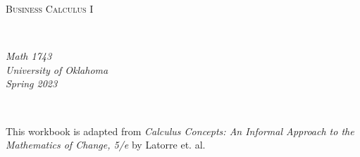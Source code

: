 \documentclass[notes]{subfiles}
\begin{document}
\rhead{}
\lhead{}
\chead{}
\thispagestyle{empty}
\[\]
\vspace{1in}
\begin{center}
	\begin{Huge}
		\textsc{Business Calculus I}
	\end{Huge}\\
		\vspace{2in}
	\begin{Large}
		\emph{Math 1743}\\
		\emph{University of Oklahoma}\\
		\emph{Spring 2023}
	\end{Large}\\
\end{center}
\vspace{1in}
\begin{center}
\end{center}
\vspace{1in}
\begin{center}
	This workbook is adapted from \emph{Calculus Concepts: An Informal Approach to the Mathematics of Change, 5/e} by Latorre et. al.
\end{center}
\newpage
\thispagestyle{empty}
	\[\]
\end{document}

